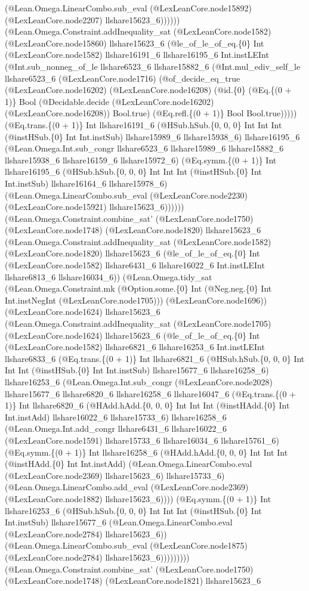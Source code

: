 \documentclass[11pt]{article}
\begin{document}
(@Lean.Omega.LinearCombo.sub\_eval (@LexLeanCore.node15892) (@LexLeanCore.node2207) llshare15623\_6)))))) (@Lean.Omega.Constraint.addInequality\_sat (@LexLeanCore.node1582) (@LexLeanCore.node15860) llshare15623\_6 (@le\_of\_le\_of\_eq.\{0\} Int (@LexLeanCore.node1582) llshare16191\_6 llshare16195\_6 Int.instLEInt (@Int.sub\_nonneg\_of\_le llshare6523\_6 llshare15882\_6 (@Int.mul\_ediv\_self\_le llshare6523\_6 (@LexLeanCore.node1716) (@of\_decide\_eq\_true (@LexLeanCore.node16202) (@LexLeanCore.node16208) (@id.\{0\} (@Eq.\{(0 + 1)\} Bool (@Decidable.decide (@LexLeanCore.node16202) (@LexLeanCore.node16208)) Bool.true) (@Eq.refl.\{(0 + 1)\} Bool Bool.true))))) (@Eq.trans.\{(0 + 1)\} Int llshare16191\_6 (@HSub.hSub.\{0, 0, 0\} Int Int Int (@instHSub.\{0\} Int Int.instSub) llshare15989\_6 llshare15938\_6) llshare16195\_6 (@Lean.Omega.Int.sub\_congr llshare6523\_6 llshare15989\_6 llshare15882\_6 llshare15938\_6 llshare16159\_6 llshare15972\_6) (@Eq.symm.\{(0 + 1)\} Int llshare16195\_6 (@HSub.hSub.\{0, 0, 0\} Int Int Int (@instHSub.\{0\} Int Int.instSub) llshare16164\_6 llshare15978\_6) (@Lean.Omega.LinearCombo.sub\_eval (@LexLeanCore.node2230) (@LexLeanCore.node15921) llshare15623\_6)))))) (@Lean.Omega.Constraint.combine\_sat' (@LexLeanCore.node1750) (@LexLeanCore.node1748) (@LexLeanCore.node1820) llshare15623\_6 (@Lean.Omega.Constraint.addInequality\_sat (@LexLeanCore.node1582) (@LexLeanCore.node1820) llshare15623\_6 (@le\_of\_le\_of\_eq.\{0\} Int (@LexLeanCore.node1582) llshare6431\_6 llshare16022\_6 Int.instLEInt llshare6813\_6 llshare16034\_6)) (@Lean.Omega.tidy\_sat (@Lean.Omega.Constraint.mk (@Option.some.\{0\} Int (@Neg.neg.\{0\} Int Int.instNegInt (@LexLeanCore.node1705))) (@LexLeanCore.node1696)) (@LexLeanCore.node1624) llshare15623\_6 (@Lean.Omega.Constraint.addInequality\_sat (@LexLeanCore.node1705) (@LexLeanCore.node1624) llshare15623\_6 (@le\_of\_le\_of\_eq.\{0\} Int (@LexLeanCore.node1582) llshare6821\_6 llshare16253\_6 Int.instLEInt llshare6833\_6 (@Eq.trans.\{(0 + 1)\} Int llshare6821\_6 (@HSub.hSub.\{0, 0, 0\} Int Int Int (@instHSub.\{0\} Int Int.instSub) llshare15677\_6 llshare16258\_6) llshare16253\_6 (@Lean.Omega.Int.sub\_congr (@LexLeanCore.node2028) llshare15677\_6 llshare6820\_6 llshare16258\_6 llshare16047\_6 (@Eq.trans.\{(0 + 1)\} Int llshare6820\_6 (@HAdd.hAdd.\{0, 0, 0\} Int Int Int (@instHAdd.\{0\} Int Int.instAdd) llshare16022\_6 llshare15733\_6) llshare16258\_6 (@Lean.Omega.Int.add\_congr llshare6431\_6 llshare16022\_6 (@LexLeanCore.node1591) llshare15733\_6 llshare16034\_6 llshare15761\_6) (@Eq.symm.\{(0 + 1)\} Int llshare16258\_6 (@HAdd.hAdd.\{0, 0, 0\} Int Int Int (@instHAdd.\{0\} Int Int.instAdd) (@Lean.Omega.LinearCombo.eval (@LexLeanCore.node2369) llshare15623\_6) llshare15733\_6) (@Lean.Omega.LinearCombo.add\_eval (@LexLeanCore.node2369) (@LexLeanCore.node1882) llshare15623\_6)))) (@Eq.symm.\{(0 + 1)\} Int llshare16253\_6 (@HSub.hSub.\{0, 0, 0\} Int Int Int (@instHSub.\{0\} Int Int.instSub) llshare15677\_6 (@Lean.Omega.LinearCombo.eval (@LexLeanCore.node2784) llshare15623\_6)) (@Lean.Omega.LinearCombo.sub\_eval (@LexLeanCore.node1875) (@LexLeanCore.node2784) llshare15623\_6))))))))) (@Lean.Omega.Constraint.combine\_sat' (@LexLeanCore.node1750) (@LexLeanCore.node1748) (@LexLeanCore.node1821) llshare15623\_6 
\end{document}
